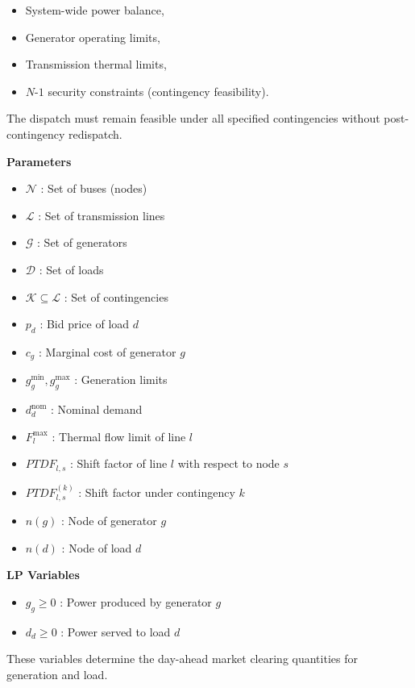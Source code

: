 \documentclass[11pt]{article}
\begin{document}
\begin{itemize}
    \item System-wide power balance,
    \item Generator operating limits,
    \item Transmission thermal limits,
    \item $N$-$1$ security constraints (contingency feasibility).
\end{itemize}

The dispatch must remain feasible under all specified contingencies without post-contingency redispatch.

\textbf{Parameters}

\begin{itemize}
    \item $\mathcal{N}$ : Set of buses (nodes)
    \item $\mathcal{L}$ : Set of transmission lines
    \item $\mathcal{G}$ : Set of generators
    \item $\mathcal{D}$ : Set of loads
    \item $\mathcal{K} \subseteq \mathcal{L}$ : Set of contingencies
    \item $p_d$ : Bid price of load $d$
    \item $c_g$ : Marginal cost of generator $g$
    \item $g_g^{\min}, g_g^{\max}$ : Generation limits
    \item $d_d^{\text{nom}}$ : Nominal demand
    \item $F_l^{\max}$ : Thermal flow limit of line $l$
    \item $PTDF_{l,s}$ : Shift factor of line $l$ with respect to node $s$
    \item $PTDF_{l,s}^{(k)}$ : Shift factor under contingency $k$
    \item $n(g)$ : Node of generator $g$
    \item $n(d)$ : Node of load $d$
\end{itemize}

\textbf{LP Variables}

\begin{itemize}
    \item $g_g \ge 0$ : Power produced by generator $g$
    \item $d_d \ge 0$ : Power served to load $d$
\end{itemize}

These variables determine the day-ahead market clearing quantities for generation and load.
\end{document}

